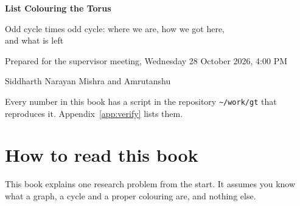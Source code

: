 \documentclass[11pt,oneside,openany]{book}
\begin{document}
\begin{titlepage}
\centering
\vspace*{2cm}
{\color{ideac!80!black}\Huge\bfseries List Colouring the Torus\par}
\vspace{0.6cm}
{\Large Odd cycle times odd cycle: where we are, how we got here,\\ and what is left\par}
\vspace{1.5cm}
\vspace{1.5cm}

{\large Prepared for the supervisor meeting, Wednesday 28 October 2026, 4:00 PM\par}
\vspace{0.4cm}
{\large Siddharth Narayan Mishra and Amrutanshu\par}
\vfill
{\small Every number in this book has a script in the repository \texttt{\textasciitilde/work/gt} that
reproduces it. Appendix~\ref{app:verify} lists them.}
\end{titlepage}

\tableofcontents

\chapter*{How to read this book}

This book explains one research problem from the start. It assumes you know what a graph, a
cycle and a proper colouring are, and nothing else.
\end{document}
